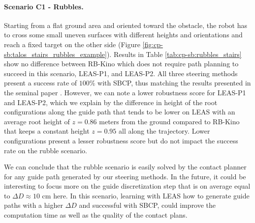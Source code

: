 \paragraph{Scenario C1 - Rubbles.}
Starting from a flat ground area and oriented toward the obstacle, the robot has to cross some small uneven surfaces with different heights and orientations and reach a fixed target on the other side (Figure \ref{fig:cp-sb:talos_stairs_rubbles_example}).
Results in Table \ref{tab:cp-sb:rubbles_stairs} show no difference between RB-Kino which does not require path planning to succeed in this scenario, LEAS-P1, and LEAS-P2. All three steering methods present a success rate of $100$\% with SBCP, thus matching the results presented in the seminal paper \cite{AcyclicCP}.
However, we can note a lower robustness score for LEAS-P1 and LEAS-P2, which we explain by the difference in height of the root configurations along the guide path that tends to be lower on LEAS with an average root height of $z=0.86$ meters from the ground compared to RB-Kino that keeps a constant height $z=0.95$ all along the trajectory.
Lower configurations present a lesser robustness score but do not impact the success rate on the rubble scenario.

We can conclude that the rubble scenario is easily solved by the contact planner for any guide path generated by our steering methods. 
In the future, it could be interesting to focus more on the guide discretization step that is on average equal to $\Delta D \approx10$ cm here. In this scenario, learning with LEAS how to generate guide paths with a higher $\Delta D$ and successful with SBCP, could improve the computation time as well as the quality of the contact plans. %


